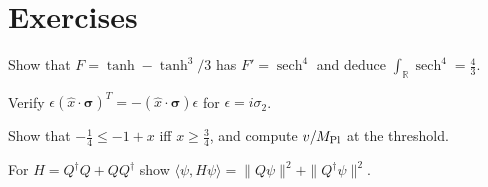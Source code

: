 \section*{Exercises}
\begin{exercise}
Show that $F=\tanh-\tanh^3/3$ has $F'=\operatorname{sech}^4$ and deduce $\int_{\mathbb R}\operatorname{sech}^4=\frac43$.
\end{exercise}
\begin{exercise}
Verify $\epsilon(\hat x\cdot\boldsymbol\sigma)^T=-(\hat x\cdot\boldsymbol\sigma)\epsilon$ for $\epsilon=i\sigma_2$.
\end{exercise}
\begin{exercise}
Show that $-\frac14\le-1+x$ iff $x\ge\frac34$, and compute $v/M_{\rm Pl}$ at the threshold.
\end{exercise}
\begin{exercise}
For $H=Q^\dagger Q+QQ^\dagger$ show $\langle\psi,H\psi\rangle=\|Q\psi\|^2+\|Q^\dagger\psi\|^2$.
\end{exercise}

